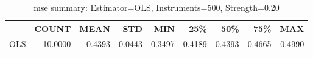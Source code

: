 \begin{table}[ht]
\centering
\caption{mse summary: Estimator=OLS, Instruments=500, Strength=0.20}
\begin{tabular}{lrrrrrrrr}
\toprule
 & COUNT & MEAN & STD & MIN & 25\% & 50\% & 75\% & MAX \\
\midrule
OLS & 10.0000 & 0.4393 & 0.0443 & 0.3497 & 0.4189 & 0.4393 & 0.4665 & 0.4990 \\
\bottomrule
\end{tabular}
\end{table}
